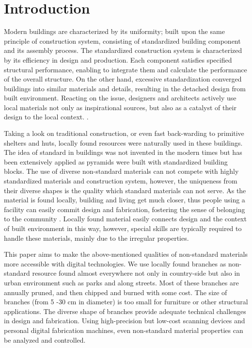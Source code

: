 \section{Introduction}
Modern buildings are characterized by its uniformity; built upon the same principle of construction system, consisting of standardized building component and its assembly process.
The standardized construction system is characterized by its efficiency in design and production.
Each component satisfies specified structural performance, enabling to integrate them and calculate the performance of the overall structure.
On the other hand, excessive standardization converged buildings into similar materials and details, resulting in the detached design from built environment.
Reacting on the issue, designers and architects actively use local materials not only as inspirational sources, but also as a catalyst of their design to the local context. \cite{oliver1997encyclopedia}.


Taking a look on traditional construction, or even fast back-warding to primitive shelters and huts, locally found resources were naturally used in these buildings.
The idea of standard in buildings was not invented in the modern times but has been extensively applied as pyramids were built with standardized building blocks.
The use of diverse non-standard materials can not compete with highly standardized materials and construction system, however, the uniqueness from their diverse shapes is the quality which standard materials can not serve.
As the material is found locally, building and living get much closer, thus people using a facility can easily commit design and fabrication, fostering the sense of belonging to the community \cite{}.
Locally found material easily connects design and the context of built environment in this way, however, special skills are typically required to handle these materials, mainly due to the irregular properties.

This paper aims to make the above-mentioned qualities of non-standard materials more accessible with digital technologies.
We use locally found branches as non-standard resource found almost everywhere not only in country-side but also in urban environment such as parks and along streets.
Most of these branches are annually pruned, and then chipped and burned with some cost.
The size of branches (from 5 -30 cm in diameter) is too small for furniture or other structural applications.
The diverse shape of branches provide adequate technical challenges in design and fabrication.
Using high-precision but low-cost scanning devices and personal digital fabrication machines, even non-standard material properties can be analyzed and controlled.

